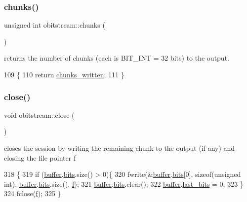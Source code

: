 \subsubsection{\texorpdfstring{chunks()}{chunks()}}
{\footnotesize\ttfamily unsigned int obitstream\+::chunks (\begin{DoxyParamCaption}{ }\end{DoxyParamCaption})\hspace{0.3cm}{\ttfamily [inline]}}



returns the number of chunks (each is B\+I\+T\+\_\+\+I\+NT = 32 bits) to the output. 


\begin{DoxyCode}
109                        \{
110     \textcolor{keywordflow}{return} \hyperlink{classobitstream_a3022397f2b6133ea5990016d9d078a2f}{chunks\_written}; 
111   \}
\end{DoxyCode}
\mbox{\label{classobitstream_a6d76dbba302e1181fbc9609072a4c2a0}} 
\subsubsection{\texorpdfstring{close()}{close()}}
{\footnotesize\ttfamily void obitstream\+::close (\begin{DoxyParamCaption}{ }\end{DoxyParamCaption})}



closes the session by writing the remaining chunk to the output (if any) and closing the file pointer f 


\begin{DoxyCode}
318                       \{
319   \textcolor{keywordflow}{if} (\hyperlink{classobitstream_aeaccad00a395a404aa16472bfa052be3}{buffer}.\hyperlink{classbit__pipe_a86f38af1e9736b053728033490476b50}{bits}.size() > 0)\{
320     fwrite(&\hyperlink{classobitstream_aeaccad00a395a404aa16472bfa052be3}{buffer}.\hyperlink{classbit__pipe_a86f38af1e9736b053728033490476b50}{bits}[0], \textcolor{keyword}{sizeof}(\textcolor{keywordtype}{unsigned} \textcolor{keywordtype}{int}), \hyperlink{classobitstream_aeaccad00a395a404aa16472bfa052be3}{buffer}.\hyperlink{classbit__pipe_a86f38af1e9736b053728033490476b50}{bits}.size(), 
      \hyperlink{classobitstream_ac589d74745217748c888ae777ab324a7}{f});
321     \hyperlink{classobitstream_aeaccad00a395a404aa16472bfa052be3}{buffer}.\hyperlink{classbit__pipe_a86f38af1e9736b053728033490476b50}{bits}.clear();
322     \hyperlink{classobitstream_aeaccad00a395a404aa16472bfa052be3}{buffer}.\hyperlink{classbit__pipe_a0f3e84b02751803adaab499b5dad86fe}{last\_bits} = 0;
323   \}
324   fclose(\hyperlink{classobitstream_ac589d74745217748c888ae777ab324a7}{f});
325 \}
\end{DoxyCode}
\mbox{\label{classobitstream_a09352e38c7d1d5bcff438c0b8ba41ff4}} 
